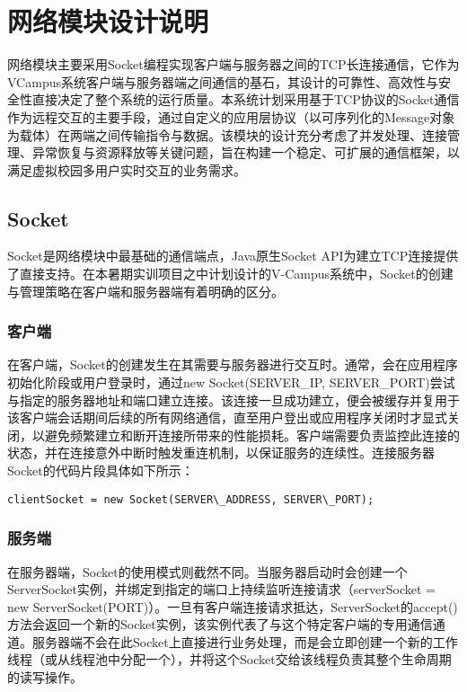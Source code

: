 \ifx\maindoc\undefined
{}
\fi

\section{网络模块设计说明}
网络模块主要采用Socket编程实现客户端与服务器之间的TCP长连接通信，它作为VCampus系统客户端与服务器端之间通信的基石，其设计的可靠性、高效性与安全性直接决定了整个系统的运行质量。本系统计划采用基于TCP协议的Socket通信作为远程交互的主要手段，通过自定义的应用层协议（以可序列化的Message对象为载体）在两端之间传输指令与数据。该模块的设计充分考虑了并发处理、连接管理、异常恢复与资源释放等关键问题，旨在构建一个稳定、可扩展的通信框架，以满足虚拟校园多用户实时交互的业务需求。
\subsection{Socket}
Socket是网络模块中最基础的通信端点，Java原生Socket API为建立TCP连接提供了直接支持。在本暑期实训项目之中计划设计的V-Campus系统中，Socket的创建与管理策略在客户端和服务器端有着明确的区分。
\subsubsection{客户端}
在客户端，Socket的创建发生在其需要与服务器进行交互时。通常，会在应用程序初始化阶段或用户登录时，通过new Socket(SERVER\_IP, SERVER\_PORT)尝试与指定的服务器地址和端口建立连接。该连接一旦成功建立，便会被缓存并复用于该客户端会话期间后续的所有网络通信，直至用户登出或应用程序关闭时才显式关闭，以避免频繁建立和断开连接所带来的性能损耗。客户端需要负责监控此连接的状态，并在连接意外中断时触发重连机制，以保证服务的连续性。连接服务器Socket的代码片段具体如下所示：
\begin{lstlisting}
clientSocket = new Socket(SERVER\_ADDRESS, SERVER\_PORT);
\end{lstlisting}
\subsubsection{服务端}
在服务器端，Socket的使用模式则截然不同。当服务器启动时会创建一个ServerSocket实例，并绑定到指定的端口上持续监听连接请求（serverSocket = new ServerSocket(PORT)）。一旦有客户端连接请求抵达，ServerSocket的accept()方法会返回一个新的Socket实例，该实例代表了与这个特定客户端的专用通信通道。服务器端不会在此Socket上直接进行业务处理，而是会立即创建一个新的工作线程（或从线程池中分配一个），并将这个Socket交给该线程负责其整个生命周期的读写操作。


